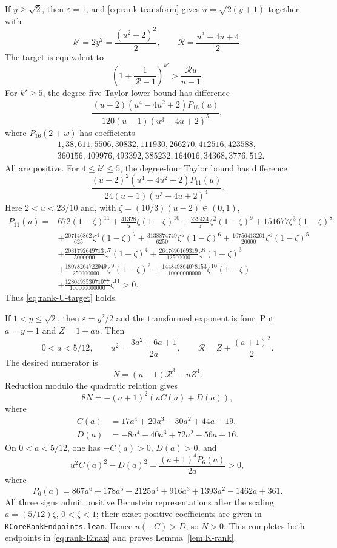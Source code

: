 \documentclass[11pt]{article}
\theoremstyle{definition}
\theoremstyle{remark}
\begin{document}
If $y\ge\sqrt2$, then $\varepsilon=1$, and \eqref{eq:rank-transform} gives
$u=\sqrt{2(y+1)}$ together with
\[
 k'=2y^2=\frac{(u^2-2)^2}{2},\qquad
 \mathcal R=\frac{u^3-4u+4}{2}.
\]
The target is equivalent to
\begin{equation}\label{eq:rank-U-target}
 \left(1+\frac1{\mathcal R-1}\right)^{k'}
 >\frac{\mathcal R u}{u-1}.
\end{equation}
For $k'\ge5$, the degree-five Taylor lower bound has difference
\[
 \frac{(u-2)(u^4-4u^2+2)P_{16}(u)}
 {120(u-1)(u^3-4u+2)^5},
\]
where $P_{16}(2+w)$ has coefficients
\[
\begin{aligned}
 &1,38,611,5506,30832,111930,266270,412516,423588,\\
 &360156,409976,493392,385232,164016,34368,3776,512.
\end{aligned}
\]
All are positive.  For $4\le k'\le5$, the degree-four Taylor bound has
difference
\[
 \frac{(u-2)^2(u^4-4u^2+2)P_{11}(u)}
 {24(u-1)(u^3-4u+2)^4}.
\]
Here $2<u<23/10$ and, with $\zeta=(10/3)(u-2)\in(0,1)$,
\begin{align*}
 P_{11}(u)={}&672(1-\zeta)^{11}+\frac{41328}{5}\zeta(1-\zeta)^{10}
 +\frac{229434}{5}\zeta^2(1-\zeta)^9+151677\zeta^3(1-\zeta)^8\\
 &+\frac{207146862}{625}\zeta^4(1-\zeta)^7
 +\frac{3138874749}{6250}\zeta^5(1-\zeta)^6
 +\frac{10756413261}{20000}\zeta^6(1-\zeta)^5\\
 &+\frac{2031792649713}{5000000}\zeta^7(1-\zeta)^4
 +\frac{2647690169319}{12500000}\zeta^8(1-\zeta)^3\\
 &+\frac{18078264722949}{250000000}\zeta^9(1-\zeta)^2
 +\frac{144849864078153}{10000000000}\zeta^{10}(1-\zeta)\\
 &+\frac{128049353071077}{100000000000}\zeta^{11}>0.
\end{align*}
Thus \eqref{eq:rank-U-target} holds.

If $1<y\le\sqrt2$, then $\varepsilon=y^2/2$ and the transformed exponent
is four.  Put $a=y-1$ and $Z=1+au$.  Then
\[
 0<a<5/12,\qquad
 u^2=\frac{3a^2+6a+1}{2a},\qquad
 \mathcal R=Z+\frac{(a+1)^2}{2}.
\]
The desired numerator is
\[
 N=(u-1)\mathcal R^3-uZ^4.
\]
Reduction modulo the quadratic relation gives
\[
 8N=-(a+1)^2(uC(a)+D(a)),
\]
where
\begin{align*}
 C(a)&=17a^4+20a^3-30a^2+44a-19,\\
 D(a)&=-8a^4+40a^3+72a^2-56a+16.
\end{align*}
On $0<a<5/12$, one has $-C(a)>0$, $D(a)>0$, and
\[
 u^2C(a)^2-D(a)^2=\frac{(a+1)^4P_6(a)}{2a}>0,
\]
where
\[
 P_6(a)=867a^6+178a^5-2125a^4+916a^3
 +1393a^2-1462a+361.
\]
All three signs admit positive Bernstein representations after the scaling
$a=(5/12)\zeta$, $0<\zeta<1$; their exact positive coefficients are given in
\texttt{KCoreRankEndpoints.lean}.  Hence $u(-C)>D$, so $N>0$.
This completes both endpoints in \eqref{eq:rank-Emax} and proves
Lemma~\ref{lem:K-rank}.
\end{document}
